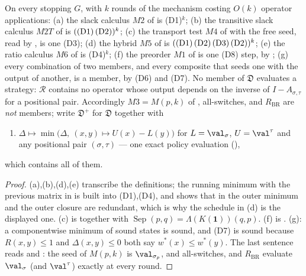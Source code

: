 \begin{lemma}\label{ob:mem}
On every stopping $G$, with $k$ rounds of the mechanism costing $O(k)$
operator applications:
\textup{(a)} the slack calculus $M2$ of  is
\textup{(D1)}$^{k}$;
\textup{(b)} the transitive slack calculus $M2T$ of
 is $(\textup{(D1)}\,\textup{(D2)})^{k}$;
\textup{(c)} the transport test $M4$ of  with the free
seed, read by , is one \textup{(D3)};
\textup{(d)} the hybrid $M5$ of  is
$(\textup{(D1)}\,\textup{(D2)}\,\textup{(D3)}\,\textup{(D2)})^{k}$;
\textup{(e)} the ratio calculus $M6$ of  is
\textup{(D4)}$^{k}$;
\textup{(f)} the preorder $M1$ of  is one
\textup{(D8)} step, by ;
\textup{(g)} every combination of two members, and every composite that
seeds one with the output of another, is a member, by \textup{(D6)} and
\textup{(D7)}.
No member of $\mathfrak D$ evaluates a strategy: $\mathcal R$ contains no
operator whose output depends on the inverse of $I-A_{\sigma,\tau}$ for a
positional pair. Accordingly $M3=M(p,k)$ of ,
all-switches,  and $R_{\mathrm{BR}}$ are \emph{not}
members; write $\mathfrak D^{+}$ for $\mathfrak D$ together with
\begin{enumerate}[label=\textup{(E)},leftmargin=3.4em]
\item $\Delta\mapsto\min\bigl(\Delta,\ (x,y)\mapsto U(x)-L(y)\bigr)$ for
  $L=\val_\sigma$, $U=\val^{\tau}$ and any positional pair
  $(\sigma,\tau)$ --- one exact policy evaluation
  (),
\end{enumerate}
which contains all of them.
\end{lemma}

\begin{proof}
(a),(b),(d),(e) transcribe the definitions; the running minimum with the
previous matrix in  is built into
\textup{(D1)},\textup{(D4)}, and  shows that in
 the outer minimum and the outer closure are redundant,
which is why the schedule in (d) is the displayed one. (c) is
 together with
$\operatorname{Sep}(p,q)=\Lambda(K(\mathbf1))(q,p)$. (f) is
. (g): a componentwise minimum of sound states is
sound, and \textup{(D7)} is sound because $R(x,y)\le1$ and
$\Delta(x,y)\le0$ both say $w^\ast(x)\le w^\ast(y)$. The last sentence
reads  and : the seed of $M(p,k)$ is
$\val_{\sigma_p}$, and all-switches,  and
$R_{\mathrm{BR}}$ evaluate $\val_\sigma$ (and $\val^{\tau}$) exactly at
every round.
\end{proof}

